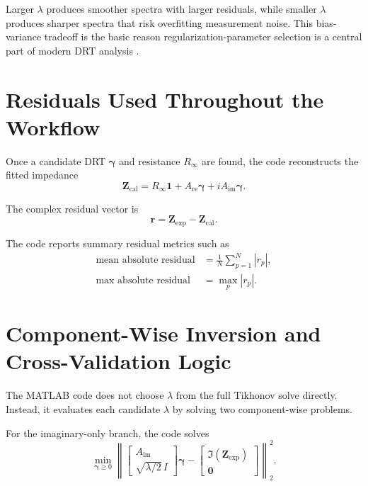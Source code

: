 \documentclass[11pt]{article}
\begin{document}
Larger $\lambda$ produces smoother spectra with larger residuals, while smaller $\lambda$ produces sharper spectra that risk overfitting measurement noise. This bias-variance tradeoff is the basic reason regularization-parameter selection is a central part of modern DRT analysis \cite{golub79,hansen93,schluter2019,maradesa2023,carbone2025}.

\section{Residuals Used Throughout the Workflow}

Once a candidate DRT $\bm{\gamma}$ and resistance $R_{\infty}$ are found, the code reconstructs the fitted impedance
\begin{equation}
\bm{Z}_{\mathrm{cal}} = R_{\infty}\bm{1} + A_{\mathrm{re}}\bm{\gamma} + iA_{\mathrm{im}}\bm{\gamma}.
\end{equation}

The complex residual vector is
\begin{equation}
\bm{r} = \bm{Z}_{\mathrm{exp}} - \bm{Z}_{\mathrm{cal}}.
\end{equation}

The code reports summary residual metrics such as
\begin{align}
\text{mean absolute residual} &= \frac{1}{N}\sum_{p=1}^N |r_p|, \\
\text{max absolute residual} &= \max_p |r_p|.
\end{align}

\section{Component-Wise Inversion and Cross-Validation Logic}

The MATLAB code does not choose $\lambda$ from the full Tikhonov solve directly. Instead, it evaluates each candidate $\lambda$ by solving two component-wise problems.

For the imaginary-only branch, the code solves
\begin{equation}
\min_{\bm{\gamma} \ge 0}
\left\|
\begin{bmatrix}
A_{\mathrm{im}} \\
\sqrt{\lambda/2}\,I
\end{bmatrix}
\bm{\gamma}
-
\begin{bmatrix}
\Im(\bm{Z}_{\mathrm{exp}}) \\
\bm{0}
\end{bmatrix}
\right\|_2^2.
\end{equation}
\end{document}
